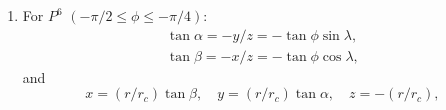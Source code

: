 \documentclass{report}
\begin{document}
\begin{enumerate}

\item For $P^6$ $\left(-\pi/2 \leq \phi \leq -\pi/4 \right)$:
\begin{equation} \label{e:P6-sphere-to-cube}
    \begin{array}{l}
        \tan\alpha = - y/z = - \tan \phi \sin \lambda,\\
        \tan\beta = - x/z = - \tan \phi \cos \lambda,
    \end{array}
\end{equation}
and
\begin{equation}
            x = (r/r_c) \tan\beta,  \quad
        y = (r/r_c)\tan\alpha,\quad
        z = -(r/r_c),
\end{equation}


\end{enumerate}
\end{document}
